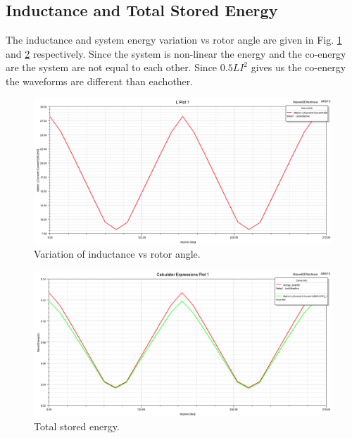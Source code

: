 \documentclass{article}
\begin{document}
\subsection{Inductance and Total Stored Energy}
The inductance and system energy variation vs rotor angle are given in Fig. \ref{fig:inductance_nonlinear} and \ref{fig:storedenergy1} respectively. Since the system is non-linear the energy and the co-energy are the system are not equal to each other. Since $0.5LI^2$ gives us the co-energy the waveforms are different than eachother.
\begin{figure}[H]
	\centering
	\includegraphics[width=1\linewidth]{Figurler/Q3/inductance}
	\caption{Variation of inductance vs rotor angle.}
	\label{fig:inductance_nonlinear}
\end{figure}

\begin{figure}[H]
	\centering
	\includegraphics[width=1\linewidth]{Figurler/Q3/stored_energy}
	\caption{Total stored energy.}
	\label{fig:storedenergy1}
\end{figure}
\end{document}
